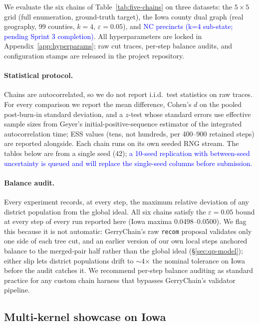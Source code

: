 \documentclass[11pt]{article}
\newcommand{\draft}[1]{\textcolor{blue}{#1}}
\begin{document}
We evaluate the six chains of Table~\ref{tab:five-chains} on three
datasets: the $5 \times 5$ grid (full enumeration, ground-truth
target), the Iowa county dual graph (real geography, 99 counties,
$k = 4$, $\varepsilon = 0.05$), and \draft{NC precincts (k=4
sub-state; pending Sprint 3 completion)}. All hyperparameters are
locked in Appendix~\ref{app:hyperparams}; raw cut traces, per-step
balance audits, and configuration stamps are released in the project
repository.

\paragraph{Statistical protocol.} Chains are autocorrelated, so we do
not report i.i.d.\ test statistics on raw traces. For every
comparison we report the mean difference, Cohen's $d$ on the pooled
post-burn-in standard deviation, and a $z$-test whose standard errors
use effective sample sizes from Geyer's initial-positive-sequence
estimator of the integrated autocorrelation time; ESS values (tens,
not hundreds, per 400--900 retained steps) are reported alongside.
Each chain runs on its own seeded RNG stream. The tables below are
from a single seed (42); \draft{a 10-seed replication with
between-seed uncertainty is queued and will replace the single-seed
columns before submission.}

\paragraph{Balance audit.}\label{sec:exp-balance} Every experiment
records, at every step, the maximum relative deviation of any district
population from the global ideal. All six chains satisfy the
$\varepsilon = 0.05$ bound at every step of every run reported here
(Iowa maxima 0.0498--0.0500). We flag this because it is not automatic:
GerryChain's raw \texttt{recom} proposal validates only one side of
each tree cut, and an earlier version of our own local steps anchored
balance to the merged-pair half rather than the global ideal
(\S\ref{sec:qp-model}); either slip lets district populations drift
to $\sim$4$\times$ the nominal tolerance on Iowa before the audit
catches it. We recommend per-step balance auditing as standard
practice for any custom chain harness that bypasses GerryChain's
validator pipeline.

\subsection{Multi-kernel showcase on Iowa}\label{sec:exp-multikernel}
\end{document}
